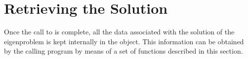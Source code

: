 
\section{Retrieving the Solution}
\label{sec:retrsol}

Once the call to  is complete, all the data associated with the solution of the eigenproblem is kept internally in the  object. This information can be obtained by the calling program by means of a set of functions described in this section.

